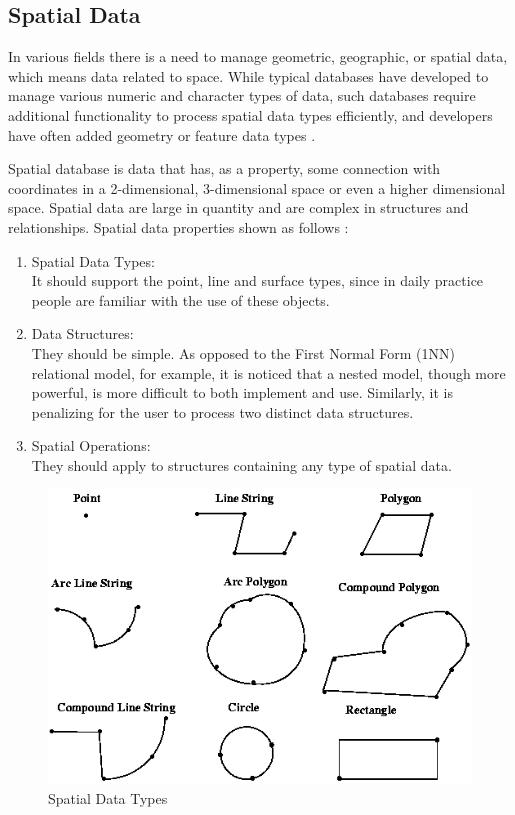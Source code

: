 \pagebreak
\subsection{Spatial Data}

In various fields there is a need to manage geometric, geographic, or spatial data, which means data related to space.  While typical databases have developed to manage various numeric and character types of data, such databases require additional functionality to process spatial data types efficiently, and developers have often added geometry or feature data types \cite{ooi1993}.

Spatial database is data that has, as a property, some connection with coordinates in a 2-dimensional, 3-dimensional space or even a higher dimensional space. Spatial data are large in quantity and are complex in structures and relationships. Spatial data properties shown as follows \cite{bonham-carter2014} :
\begin{enumerate}[leftmargin=*, topsep=5pt, itemsep=-1ex, partopsep=1ex, parsep=2ex]
\item Spatial Data Types: \\ It should support the point, line and surface types, since in daily practice people are familiar with the use of these objects.
\item Data Structures: \\ They should be simple. As opposed to the First Normal Form (1NN) relational model, for example, it is noticed that a nested model, though more powerful, is more difficult to both implement and use. Similarly, it is penalizing for the user to process two distinct data structures.
\item Spatial Operations: \\ They should apply to structures containing any type of spatial data.
\end{enumerate}

\begin{figure}[H]
    \centering
    \includegraphics[scale=0.6]{spatial_data.png}
    \caption{Spatial Data Types}
    \label{fig:gis}
\end{figure}


